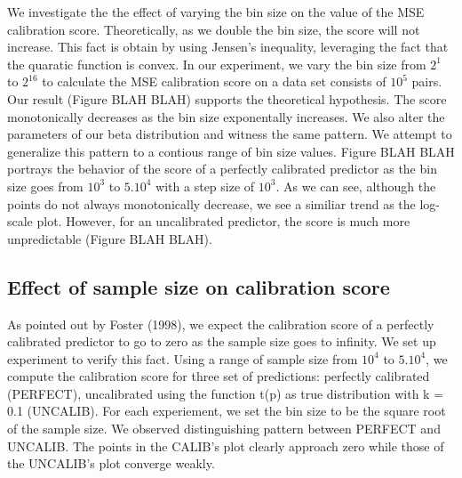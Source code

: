 We investigate the the effect of varying the bin size on the value of the MSE calibration score. Theoretically, as we double the bin size, the score will not increase. This fact is obtain by using Jensen's inequality, leveraging the fact that the quaratic function is convex. In our experiment, we vary the bin size from $2^1$ to $2^16$ to calculate the MSE calibration score on a data set consists of $10^5$ pairs. Our result (Figure BLAH BLAH) supports the theoretical hypothesis. The score monotonically decreases as the bin size exponentally increases. We also alter the parameters of our beta distribution and witness the same pattern. We attempt to generalize this pattern to a contious range of bin size values. Figure BLAH BLAH portrays the behavior of the score of a perfectly calibrated predictor as the bin size goes from $10^3$ to $5.10^4$ with a step size of $10^3$. As we can see, although the points do not always monotonically decrease, we see a similiar trend as the log-scale plot. However, for an uncalibrated predictor, the score is much more unpredictable (Figure BLAH BLAH). 

\subsection{Effect of sample size on calibration score}

As pointed out by Foster (1998), we expect the calibration score of a perfectly calibrated predictor to go to zero as the sample size goes to infinity. We set up experiment to verify this fact. Using a range of sample size from $10^4$ to $5.10^4$, we compute the calibration score for three set of predictions: perfectly calibrated (PERFECT), uncalibrated using the function t(p) as true distribution with k = 0.1 (UNCALIB). For each experiement, we set the bin size to be the square root of the sample size. We observed distinguishing pattern between PERFECT and UNCALIB. The points in the CALIB's plot clearly approach zero while those of the UNCALIB's plot converge weakly. 


